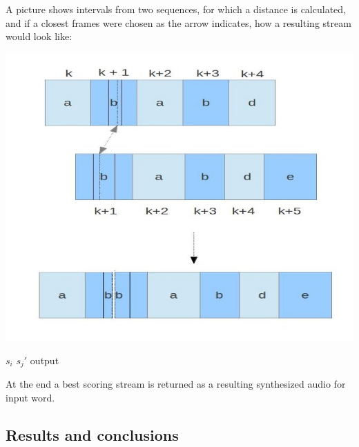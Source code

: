 \documentclass[12pt,a4paper,english]{article}
\begin{document}
A picture shows intervals from two sequences, for which a distance is calculated, and if a closest frames were chosen as the arrow indicates, how a resulting stream would look like:

\begin{minipage}[0,0]{15cm}
    \includegraphics[scale=0.5]{audio_merging.jpg}
\end{minipage}
\begin{minipage}[15cm,0]{4cm}
$s_i$
\newline
\newline
\newline
\newline
\newline
\newline
$s_j'$
\newline
\newline
\newline
\newline
\newline
\newline
\newline
\newline
output 
\end{minipage}
At the end a best scoring stream is returned as a resulting synthesized audio for input word.

\newpage
\subsection{Results and conclusions}
\end{document}
